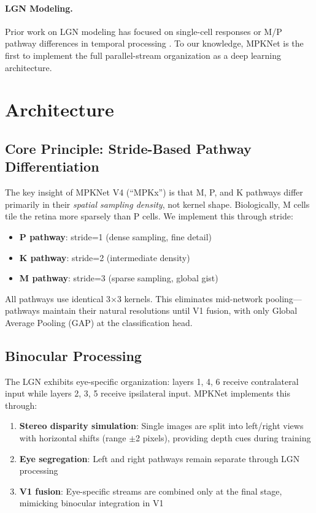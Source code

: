 \documentclass[11pt]{article}
\begin{document}
\paragraph{LGN Modeling.} Prior work on LGN modeling has focused on single-cell responses \citep{carandini2005we} or M/P pathway differences in temporal processing \citep{derrington1984spatial}. To our knowledge, MPKNet is the first to implement the full parallel-stream organization as a deep learning architecture.

\section{Architecture}

\subsection{Core Principle: Stride-Based Pathway Differentiation}

The key insight of MPKNet V4 (``MPKx'') is that M, P, and K pathways differ primarily in their \textit{spatial sampling density}, not kernel shape. Biologically, M cells tile the retina more sparsely than P cells. We implement this through stride:

\begin{itemize}
    \item \textbf{P pathway}: stride=1 (dense sampling, fine detail)
    \item \textbf{K pathway}: stride=2 (intermediate density)
    \item \textbf{M pathway}: stride=3 (sparse sampling, global gist)
\end{itemize}

All pathways use identical 3$\times$3 kernels. This eliminates mid-network pooling---pathways maintain their natural resolutions until V1 fusion, with only Global Average Pooling (GAP) at the classification head.

\subsection{Binocular Processing}

The LGN exhibits eye-specific organization: layers 1, 4, 6 receive contralateral input while layers 2, 3, 5 receive ipsilateral input. MPKNet implements this through:

\begin{enumerate}
    \item \textbf{Stereo disparity simulation}: Single images are split into left/right views with horizontal shifts (range $\pm$2 pixels), providing depth cues during training
    \item \textbf{Eye segregation}: Left and right pathways remain separate through LGN processing
    \item \textbf{V1 fusion}: Eye-specific streams are combined only at the final stage, mimicking binocular integration in V1
\end{enumerate}
\end{document}
